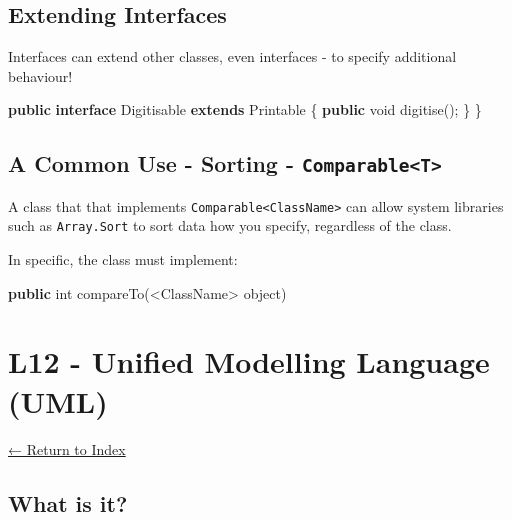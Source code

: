 \documentclass[]{article}
\newenvironment{Shaded}{}{}
\newcommand{\BuiltInTok}[1]{#1}
\newcommand{\DataTypeTok}[1]{\textcolor[rgb]{0.56,0.13,0.00}{#1}}
\newcommand{\FunctionTok}[1]{\textcolor[rgb]{0.02,0.16,0.49}{#1}}
\newcommand{\KeywordTok}[1]{\textcolor[rgb]{0.00,0.44,0.13}{\textbf{#1}}}
\newcommand{\NormalTok}[1]{#1}
\begin{document}
\hypertarget{extending-interfaces}{%
\subsection{Extending Interfaces}\label{extending-interfaces}}

Interfaces can extend other classes, even interfaces - to specify
additional behaviour!

\begin{Shaded}
\begin{Highlighting}[]
\KeywordTok{public} \KeywordTok{interface}\NormalTok{ Digitisable }\KeywordTok{extends} \BuiltInTok{Printable}\NormalTok{ \{}
    \KeywordTok{public} \DataTypeTok{void} \FunctionTok{digitise}\NormalTok{();}
\NormalTok{    \}}
\NormalTok{\}}
\end{Highlighting}
\end{Shaded}

\hypertarget{a-common-use---sorting---comparablet}{%
\subsection{\texorpdfstring{A Common Use - Sorting -
\texttt{Comparable\textless{}T\textgreater{}}}{A Common Use - Sorting - Comparable\textless{}T\textgreater{}}}\label{a-common-use---sorting---comparablet}}

A class that that implements
\texttt{Comparable\textless{}ClassName\textgreater{}} can allow system
libraries such as \texttt{Array.Sort} to sort data how you specify,
regardless of the class.

In specific, the class must implement:

\begin{Shaded}
\begin{Highlighting}[]
\KeywordTok{public} \DataTypeTok{int} \FunctionTok{compareTo}\NormalTok{(<ClassName> object)}
\end{Highlighting}
\end{Shaded}

\hypertarget{l12---unified-modelling-language-uml}{%
\section{L12 - Unified Modelling Language
(UML)}\label{l12---unified-modelling-language-uml}}

\protect\hyperlink{table-of-contents}{← Return to Index}

\hypertarget{what-is-it}{%
\subsection{What is it?}\label{what-is-it}}
\end{document}
